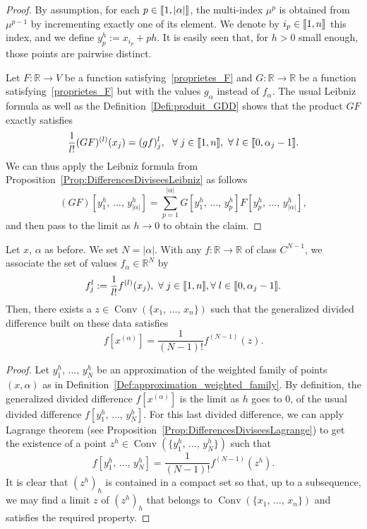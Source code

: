 \documentclass[10pt]{amsart}
\theoremstyle{definition}\newtheorem{defi}[theo]{Definition}\newtheorem{rema}[theo]{Remark}\newtheorem{exam}[theo]{Example}\newtheorem{exem}[theo]{Example}\newtheorem{nota}[theo]{Notation}
\DeclareMathOperator{\Conv}{Conv}
\newcommand{\llbracket}{\mathopen{[\mkern -2.7mu[}}
\newcommand{\rrbracket}{\mathclose{]\mkern -2.7mu]}}
\newcommand{\inter}[2]{\llbracket #1,#2 \rrbracket}
\newcommand{\R}{\mathbb{R}}
\let\oldforall\forall
\renewcommand*{\forall}{\mathrel{\oldforall}}
\begin{document}
\begin{proof}
By assumption, for each $p\in \inter{1}{|\alpha|}$, the multi-index $\mu^{p}$ is obtained from $\mu^{p-1}$ by incrementing exactly one of its element. We denote by $i_p\in \inter{1}{n}$ this index, and we define $y_p^h:=x_{i_p}+ph$. It is easily seen that, for $h>0$ small enough, those points are pairwise distinct.

Let $F:\R\to V$ be a function satisfying~\eqref{proprietes_F} and $G:\R\to \R$ be a function satisfying~\eqref{proprietes_F} but with the values $g_{\alpha}$ instead of $f_{\alpha}$. The usual Leibniz formula as well as the Definition~\ref{Defi:produit_GDD} shows that the product $GF$ exactly satisfies
\[
\frac{1}{l!}(GF)^{(l)}(x_j) = (gf)_j^l, \ \ \forall j\in \inter{1}{n},\ \forall l\in \inter{0}{\alpha_j-1}.
\]
We can thus apply the Leibniz formula from Proposition~\ref{Prop:DifferencesDiviseesLeibniz} as follows
\[
(GF)\left[y_1^h,\,\dotsc,\,y_{|\alpha|}^h\right] = \sum_{p=1}^{|\alpha|} G\left[y_1^h,\,\dotsc,\,y_{p}^h\right] F\left[y_p^h,\,\dotsc,\,y_{|\alpha|}^h\right],
\]
and then pass to the limit as $h\to 0$ to obtain the claim.
\end{proof}
\pagebreak

\begin{prop}
Let $x$, $\alpha$ as before. We set $N=|\alpha|$. With any $f:\R\to \R$ of class $C^{N-1}$, we associate the set of values $f_\alpha\in \R^{N}$ by
\[
f_j^l:=\frac{1}{l!} f^{(l)}(x_j), \ \forall j\in \inter{1}{n}, \forall l\in \inter{0}{\alpha_j-1}.
\]
Then, there exists a $z\in \Conv(\{x_1,\,\dotsc,\,x_n\})$ such that the generalized divided difference built on these data satisfies
\[
f\left[x^{(\alpha)}\right] = \frac{1}{(N-1)!} f^{(N-1)}(z).
\]
\end{prop}

\begin{proof}
Let $y_1^h,\,\dotsc,\,y_N^h$ be an approximation of the weighted family of points $(x,\alpha)$ as in Definition~\ref{Def:approximation_weighted_family}. By definition, the generalized divided difference $f[x^{(\alpha)}]$ is the limit as $h$ goes to $0$, of the usual divided difference $f[y_1^h,\,\dotsc,\,y_N^h]$. For this last divided difference, we can apply Lagrange theorem (see Proposition~\ref{Prop:DifferencesDiviseesLagrange}) to get the existence of a point $z^h\in \Conv (\{y_1^h,\,\dotsc,\,y_N^h\})$ such that
\[
f\left[y_1^h,\,\dotsc,\,y_N^h\right]=\frac{1}{(N-1)!} f^{(N-1)}(z^h).
\]
It is clear that $(z^h)_h$ is contained in a compact set so that, up to a subsequence, we may find a limit $z$ of $(z^h)_h$ that belongs to $\Conv(\{x_1,\,\dotsc,\,x_n\})$ and satisfies the required property.
\end{proof}
\end{document}
